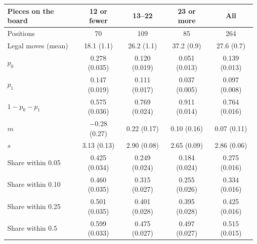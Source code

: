 \begin{tabular}{lcccc}
\toprule
Pieces on the board & 12 or fewer & 13--22 & 23 or more & All \\
\midrule
Positions & 70 & 109 & 85 & 264 \\
Legal moves (mean) & 18.1 (1.1) & 26.2 (1.1) & 37.2 (0.9) & 27.6 (0.7) \\
$p_0$ & 0.278 (0.035) & 0.120 (0.019) & 0.051 (0.013) & 0.139 (0.013) \\
$p_1$ & 0.147 (0.019) & 0.111 (0.017) & 0.037 (0.005) & 0.097 (0.008) \\
$1-p_0-p_1$ & 0.575 (0.036) & 0.769 (0.024) & 0.911 (0.014) & 0.764 (0.016) \\
$m$ & $-$0.28 (0.27) & 0.22 (0.17) & 0.10 (0.16) & 0.07 (0.11) \\
$s$ & 3.13 (0.13) & 2.90 (0.08) & 2.65 (0.09) & 2.86 (0.06) \\
Share within 0.05 & 0.425 (0.034) & 0.249 (0.024) & 0.184 (0.024) & 0.275 (0.016) \\
Share within 0.10 & 0.460 (0.035) & 0.315 (0.027) & 0.255 (0.026) & 0.334 (0.016) \\
Share within 0.25 & 0.501 (0.035) & 0.401 (0.028) & 0.395 (0.028) & 0.425 (0.016) \\
Share within 0.5 & 0.599 (0.033) & 0.475 (0.027) & 0.497 (0.027) & 0.515 (0.015) \\
\bottomrule
\end{tabular}
